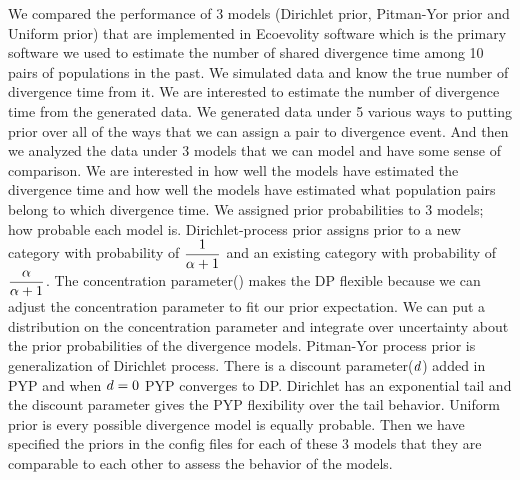 \documentclass[letterpaper,12pt]{article}
\begin{document}
We compared the performance of 3 models (Dirichlet prior, Pitman-Yor prior and Uniform prior) 
that are implemented in Ecoevolity software which is the primary software we used to estimate the number of shared divergence time 
among 10 pairs of populations in the past. We simulated data and know the true number of divergence time from it. We are interested 
to estimate the number of divergence time from the generated data. We generated data under 5 various ways to putting prior over all
of the ways that we can assign a pair to divergence event. And then we analyzed the data under 3 models that we can model  
and have some sense of comparison. We are interested in how well the models have estimated the divergence time and how well 
the models have estimated what population pairs belong to which divergence time. We assigned prior probabilities to 3 models; how probable each model is. Dirichlet-process prior 
assigns prior to a new category with probability of \(\dfrac{1}{\alpha +1}\) and an existing category with probability of \(\dfrac{\alpha}{\alpha+1}\). The concentration parameter(\concentration) 
makes the DP flexible because we can adjust the concentration parameter to fit our prior expectation. We can put a distribution on the 
concentration parameter and integrate over uncertainty about the prior probabilities of the divergence models. Pitman-Yor process prior is 
generalization of Dirichlet process. There is a discount parameter($d$) added in PYP and when $d= 0$ PYP converges to DP. Dirichlet has an exponential tail 
and the discount parameter gives the PYP flexibility over the tail behavior. Uniform prior is every possible divergence model is equally probable. 
Then we have specified the priors in the config files for each of these 3 models that they are comparable to each other to assess the behavior of the models. 
\end{document}
